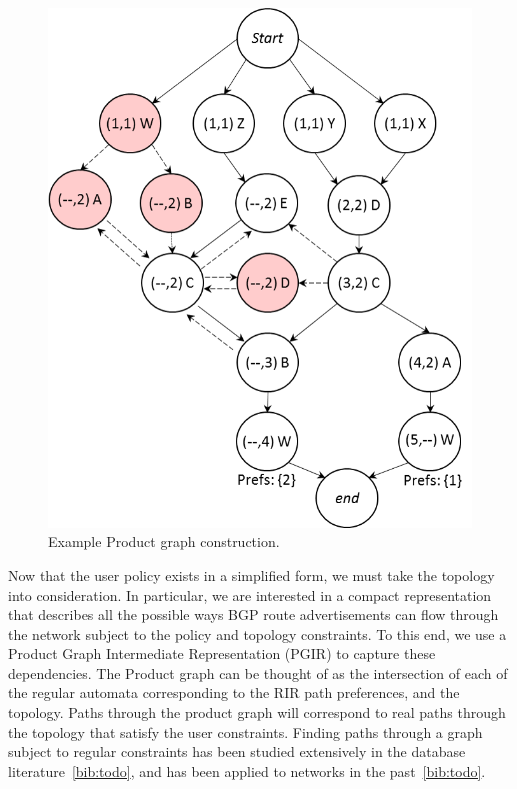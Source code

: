 \begin{figure}
\begin{minipage}[t]{.5\linewidth}
  
  \end{minipage}
  ~~
  ~~
  \begin{minipage}[t]{.5\linewidth}
  \vspace*{-1\baselineskip}
  \includegraphics[width=.8\columnwidth]{figures/productgraph}
  \end{minipage}

  \hrulefill

  \caption{Example Product graph construction.}
  \label{fig:example-compilation}
\end{figure}


Now that the user policy exists in a simplified form, we must take the topology into consideration. In particular, we are interested in a compact representation that describes all the possible ways BGP route advertisements can flow through the network subject to the policy and topology constraints. To this end, we use a Product Graph Intermediate Representation (PGIR) to capture these dependencies. The Product graph can be thought of as the intersection of each of the regular automata corresponding to the RIR path preferences, and the topology. Paths through the product graph will correspond to real paths through the topology that satisfy the user constraints. Finding paths through a graph subject to regular constraints has been studied extensively in the database literature~\ref{bib:todo}, and has been applied to networks in the past~\ref{bib:todo}.

